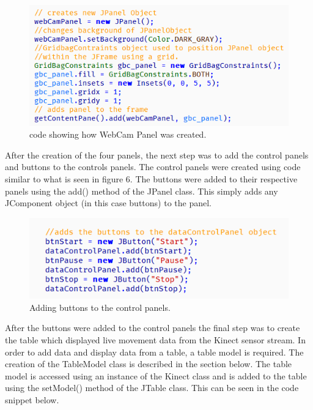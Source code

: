 \documentclass[a4paper, 12pt]{article}
\begin{document}
\begin{figure}[!htb]
	\begin{center}
  \includegraphics[scale=0.7]{codesnippet1.png}
  	\caption{code showing how WebCam Panel was created.}
  \end{center} 
  \label{fig: codesnippet2} 
\end{figure}


After the creation of the four panels, the next step was to add the control panels and buttons to the controls panels. The control panels were created using code similar to what is seen in figure 6. The buttons were added to their respective panels using the add() method of the JPanel class. This simply adds any JComponent object (in this case buttons) to the panel. 


\begin{figure}[!htb]
	\begin{center}
  \includegraphics[scale=0.7]{codesnippet3.png}
  	\caption{Adding buttons to the control panels.}
  \end{center} 
  \label{fig: codesnippet3} 
\end{figure}

After the buttons were added to the control panels the final step was to create the table which displayed live movement data from the Kinect sensor stream. In order to add data and display data from a table, a table model is required. The creation of the TableModel class is described in the section below. The table model is accessed using an instance of the Kinect class and is added to the table using the setModel() method of the JTable class. This can be seen in the code snippet below. 
\end{document}
